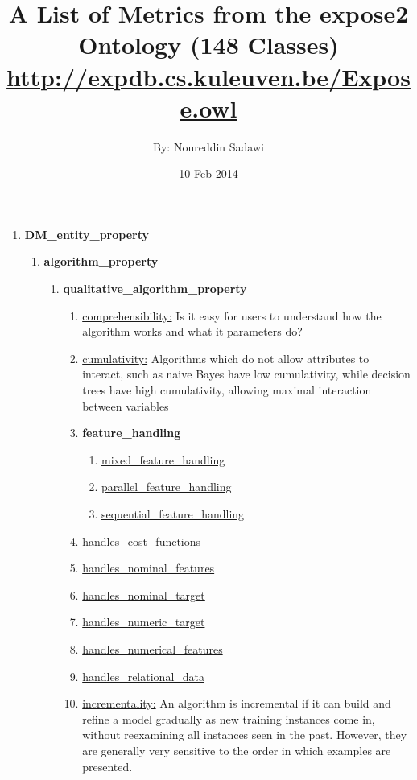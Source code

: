 \documentclass[a4paper,12pt, english]{article}
\begin{document}
\title{A List of Metrics from the expose2 Ontology (148 Classes)\\ \small{\url{http://expdb.cs.kuleuven.be/Expose.owl}}}
\date{10 Feb 2014}
\author{By: Noureddin Sadawi}
\maketitle

\large
\begin{enumerate}
\item \textbf{DM\_entity\_property}


\begin{enumerate}

\item \textbf{algorithm\_property}
	\begin{enumerate}
	\item \textbf{ qualitative\_algorithm\_property}
		\begin{enumerate}
		\item \underline{comprehensibility:} Is it easy for users to understand how the algorithm works and what it parameters do?
		\item \underline{cumulativity:} Algorithms which do not allow attributes to interact, such as naive Bayes have low cumulativity, while decision trees have high cumulativity, allowing maximal interaction between variables
		\item \textbf{ feature\_handling}
			\begin{enumerate}
			\item \underline{mixed\_feature\_handling}
			\item \underline{parallel\_feature\_handling}
			\item \underline{sequential\_feature\_handling}
			\end{enumerate}
		\item \underline{handles\_cost\_functions}
		\item \underline{handles\_nominal\_features}
		\item \underline{handles\_nominal\_target}
		\item \underline{handles\_numeric\_target}
		\item \underline{handles\_numerical\_features}
		\item \underline{handles\_relational\_data}
		\item \underline{incrementality:} An algorithm is incremental if it can build and refine a model gradually as new training instances come in, without reexamining all instances seen in the past. However, they are generally very sensitive to the order in which examples are presented.

\end{enumerate}
\end{enumerate}
\end{enumerate}
\end{enumerate}
\end{document}

